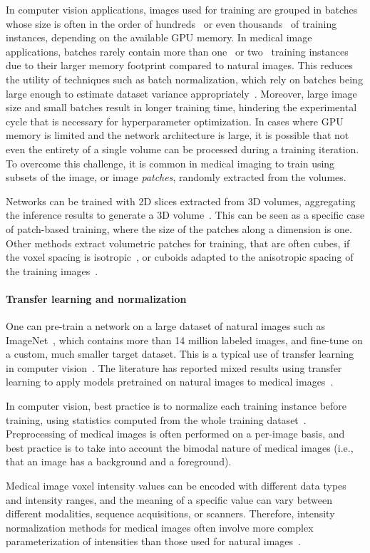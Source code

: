 In computer vision applications, images used for training are grouped in batches whose size is often in the order of hundreds~\cite{krizhevsky_imagenet_2012} or even thousands~\cite{chen_simple_2020} of training instances, depending on the available \ac{GPU} memory.
In medical image applications, batches rarely contain more than one~\cite{cicek_3d_2016} or two~\cite{milletari_v-net_2016} training instances due to their larger memory footprint compared to natural images.
This reduces the utility of techniques such as batch normalization, which rely on batches being large enough to estimate dataset variance appropriately~\cite{ioffe_batch_2015}.
Moreover, large image size and small batches result in longer training time, hindering the experimental cycle that is necessary for hyperparameter optimization.
In cases where \ac{GPU} memory is limited and the network architecture is large, it is possible that not even the entirety of a single volume can be processed during a training iteration.
To overcome this challenge, it is common in medical imaging to train using subsets of the image, or image \textit{patches}, randomly extracted from the volumes.

Networks can be trained with 2D slices extracted from 3D volumes, aggregating the inference results to generate a 3D volume~\cite{lucena_convolutional_2019}.
This can be seen as a specific case of patch-based training, where the size of the patches along a dimension is one.
Other methods extract volumetric patches for training, that are often cubes, if the voxel spacing is isotropic~\cite{li_compactness_2017}, or cuboids adapted to the anisotropic spacing of the training images~\cite{nikolov_deep_2018}.


\paragraph{Transfer learning and normalization}

One can pre-train a network on a large dataset of natural images such as ImageNet~\cite{deng_imagenet_2009}, which contains more than 14 million labeled images, and fine-tune on a custom, much smaller target dataset.
This is a typical use of transfer learning in computer vision~\cite{weiss_survey_2016}.
The literature has reported mixed results using transfer learning to apply models pretrained on natural images to medical images~\cite{cheplygina_cats_2019,raghu_transfusion_2019}.

In computer vision, best practice is to normalize each training instance before training, using statistics computed from the whole training dataset~\cite{krizhevsky_imagenet_2012}.
Preprocessing of medical images is often performed on a per-image basis, and best practice is to take into account the bimodal nature of medical images (i.e., that an image has a background and a foreground).

Medical image voxel intensity values can be encoded with different data types and intensity ranges, and the meaning of a specific value can vary between different modalities, sequence acquisitions, or scanners.
Therefore, intensity normalization methods for medical images often involve more complex parameterization of intensities than those used for natural images~\cite{nyul_standardizing_1999}.
